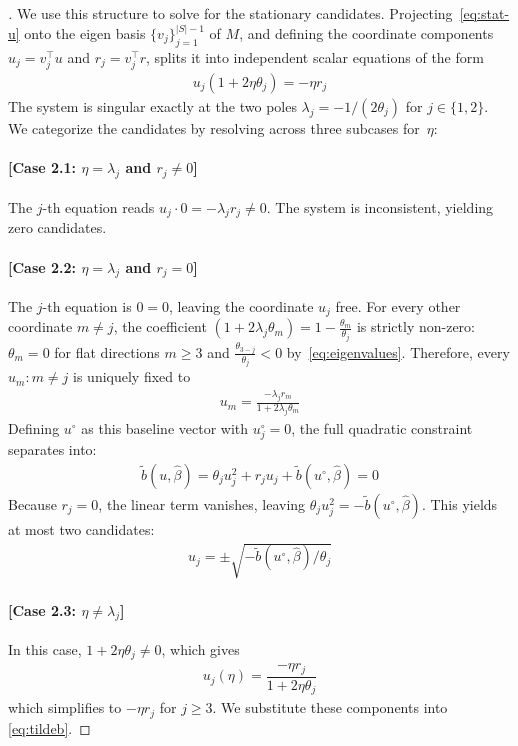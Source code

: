 \documentclass[11pt]{article}
\begin{document}
\begin{proof}[]
We use this structure to solve for the stationary candidates. Projecting~\eqref{eq:stat-u} onto the eigen basis $\{v_j\}_{j=1}^{|S|-1}$ of $M$, and defining the coordinate components $u_j = v_j^\top u$ and $r_j = v_j^\top r$, splits it into independent scalar equations of the form
\begin{align}
u_j (1+2\eta\theta_j) = -\eta r_j
\end{align}
The system is singular exactly at the two poles $\lambda_j = -1/(2\theta_j)$ for $j \in \{1,2\}$. We categorize the candidates by resolving across three subcases for~$\eta$:

\paragraph{[Case 2.1: $\eta = \lambda_j$ and $r_j \neq 0$]} The $j$-th equation reads $u_j \cdot 0 = -\lambda_j r_j \neq 0$. The system is inconsistent, yielding zero candidates.

\paragraph{[Case 2.2: $\eta = \lambda_j$ and $r_j = 0$]} The $j$-th equation is $0=0$, leaving the coordinate $u_j$ free.
For every other coordinate $m \neq j$, the coefficient $(1 + 2\lambda_j \theta_m) = 1 - \frac{\theta_m}{\theta_j}$ is strictly non-zero: $\theta_m{=}0$ for flat directions $m\ge3$ and $\frac{\theta_{3-j}}{\theta_j}<0$ by~\eqref{eq:eigenvalues}. Therefore, every $u_m:m \neq j$ is uniquely fixed to
\begin{align}
u_m = \frac{-\lambda_j r_m}{1 + 2\lambda_j \theta_m}
\end{align}
Defining $u^\circ$ as this baseline vector with $u_j^\circ = 0$, the full quadratic constraint separates into:
\begin{align}
    \tilde{b}(u, \hat\beta) = \theta_j u_j^2 + r_j u_j + \tilde{b}(u^\circ, \hat\beta) = 0
\end{align}
Because $r_j = 0$, the linear term vanishes, leaving $\theta_j u_j^2 = -\tilde{b}(u^\circ, \hat\beta)$. This yields at most two candidates:
\begin{align}
    u_j = \pm\sqrt{-\tilde{b}(u^\circ, \hat\beta)/\theta_j}\label{eq:case21}
\end{align}

\paragraph{[Case 2.3: $\eta \neq \lambda_j$]} In this case, $1+2\eta\theta_j \neq 0$, which gives
\begin{align}
    u_j(\eta) =
    \dfrac{-\eta {r}_j}{1 + 2\eta\theta_j}
\end{align}
which simplifies to $-\eta {r}_j$ for $j \ge 3$.
We substitute these components into \eqref{eq:tildeb}.


\end{proof}
\end{document}
